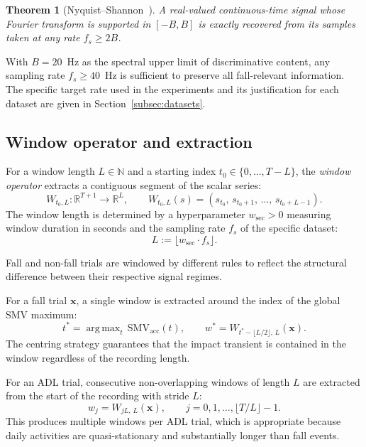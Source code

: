 \documentclass[onluarkali,ingilizce,yukseklisans,karton,LisansustuEgitim]{itutez}
\newtheorem{theorem}{Theorem}[chapter]
\DeclareMathOperator*{\argmax}{arg\,max}
\providecommand{\R}{\mathbb{R}}
\providecommand{\N}{\mathbb{N}}
\providecommand{\1}{\mathbf{1}}
\begin{document}
\begin{theorem}[Nyquist--Shannon~\parencite{shannon1949communication}]
\label{thm:nyquist}
A real-valued continuous-time signal whose Fourier transform is supported in $[-B,B]$ is exactly recovered from its samples taken at any rate $f_s\geq 2B$.
\end{theorem}

With $B=20$~Hz as the spectral upper limit of discriminative content, any sampling rate $f_s\geq 40$~Hz is sufficient to preserve all fall-relevant information. The specific target rate used in the experiments and its justification for each dataset are given in Section~\ref{subsec:datasets}.

\subsection{Window operator and extraction}
\label{subsubsec:windows}

For a window length $L\in\N$ and a starting index $t_0\in\{0,\ldots,T-L\}$, the \emph{window operator} extracts a contiguous segment of the scalar series:
\begin{equation}
  W_{t_0,L}\colon\R^{T+1}\longrightarrow\R^{L},
  \qquad
  W_{t_0,L}(s)=(s_{t_0},\,s_{t_0+1},\,\ldots,\,s_{t_0+L-1}).
  \label{eq:window-op}
\end{equation}
The window length is determined by a hyperparameter $w_{\mathrm{sec}}>0$ measuring window duration in seconds and the sampling rate $f_s$ of the specific dataset:
\[
  L:=\lfloor w_{\mathrm{sec}}\cdot f_s\rfloor.
\]

Fall and non-fall trials are windowed by different rules to reflect the structural difference between their respective signal regimes.

For a fall trial $\mathbf{x}$, a single window is extracted around the index of the global SMV maximum:
\begin{equation}
  t^*=\argmax_{t}\,\mathrm{SMV}_{\mathrm{acc}}(t),\qquad
  w^*=W_{t^*-\lfloor L/2\rfloor,\,L}(\mathbf{x}).
  \label{eq:fall-window}
\end{equation}
The centring strategy guarantees that the impact transient is contained in the window regardless of the recording length.

For an ADL trial, consecutive non-overlapping windows of length $L$ are extracted from the start of the recording with stride $L$:
\begin{equation}
  w_j=W_{jL,\,L}(\mathbf{x}),\qquad j=0,1,\ldots,\lfloor T/L\rfloor-1.
  \label{eq:adl-window}
\end{equation}
This produces multiple windows per ADL trial, which is appropriate because daily activities are quasi-stationary and substantially longer than fall events.
\end{document}
